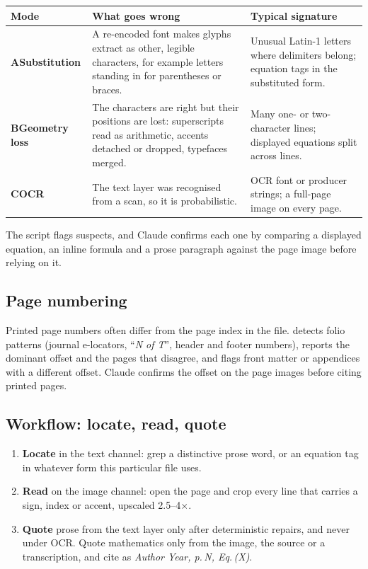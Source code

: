 \documentclass[11pt,a4paper]{article}
\newcommand\step[1]{\textsf{\textbf{#1}}}
\begin{document}
\begin{center}
\small
\begin{tabularx}{\linewidth}{@{}>{\bfseries}l X X@{}}
\toprule
\textbf{Mode} & \textbf{What goes wrong} & \textbf{Typical signature} \\
\midrule
A\enspace Substitution & A re-encoded font makes glyphs extract as other, legible
  characters, for example letters standing in for parentheses or braces. &
  Unusual Latin-1 letters where delimiters belong; equation tags in the substituted form. \\
B\enspace Geometry loss & The characters are right but their positions are lost: superscripts
  read as arithmetic, accents detached or dropped, typefaces merged. &
  Many one- or two-character lines; displayed equations split across lines. \\
C\enspace OCR & The text layer was recognised from a scan, so it is probabilistic. &
  OCR font or producer strings; a full-page image on every page. \\
\bottomrule
\end{tabularx}
\end{center}

\noindent The script flags suspects, and Claude confirms each one by comparing a displayed
equation, an inline formula and a prose paragraph against the page image before relying on it.

\subsection{Page numbering}
Printed page numbers often differ from the page index in the file.  detects
folio patterns (journal e-locators, ``\emph{N of T}'', header and footer numbers), reports
the dominant offset and the pages that disagree, and flags front matter or appendices with a
different offset. Claude confirms the offset on the page images before citing printed pages.

\subsection{Workflow: locate, read, quote}
\begin{enumerate}
\item \step{Locate} in the text channel: grep a distinctive prose word, or an equation tag in
  whatever form this particular file uses.
\item \step{Read} on the image channel: open the page and crop every line that carries a sign,
  index or accent, upscaled 2.5--4$\times$.
\item \step{Quote} prose from the text layer only after deterministic repairs, and never under
  OCR. Quote mathematics only from the image, the source or a transcription, and cite as
  \emph{Author Year, p.\,N, Eq.\,(X)}.
\end{enumerate}
\end{document}
